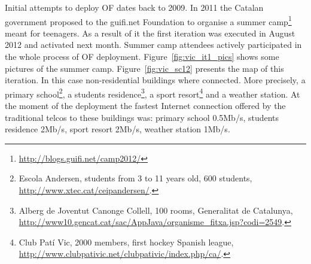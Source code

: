 Initial attempts to deploy OF dates back to 2009. In 2011 the Catalan government proposed to the guifi.net Foundation to organise a summer camp\footnote{\url{http://blogs.guifi.net/camp2012/}} meant for teenagers. As a result of it the first iteration was executed in August 2012 and activated next month. Summer camp attendees actively participated in the whole process of OF deployment. Figure~\ref{fig:vic_it1_pics} shows some pictures of the summer camp. Figure~\ref{fig:vic_sc12} presents the map of this iteration. In this case non-residential buildings where connected. More precisely, a primary school\footnote{Escola Andersen, students from 3 to 11 years old, 600 students, \url{http://www.xtec.cat/ceipandersen/}.}, a students residence\footnote{Alberg de Joventut Canonge Collell, 100 rooms, Generalitat de Catalunya, \url{http://www10.gencat.cat/sac/AppJava/organisme_fitxa.jsp?codi=2549}.}, a sport resort\footnote{Club Patí Vic, 2000 members, first hockey Spanish league, \url{http://www.clubpativic.net/clubpativic/index.php/ca/}.} and a weather station. At the moment of the deployment the fastest Internet connection offered by the traditional telcos to these buildings was: primary school 0.5Mb/s, students residence 2Mb/s, sport resort 2Mb/s, weather station 1Mb/s.

